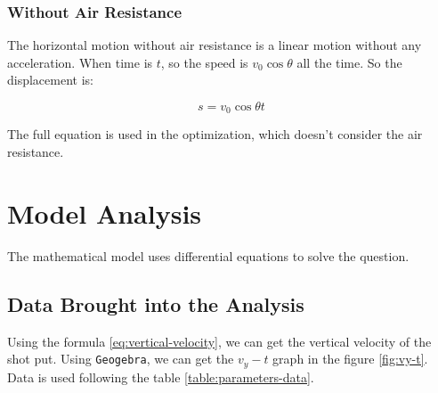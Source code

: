 \documentclass{article}
\begin{document}
\subsubsection{Without Air Resistance}

The horizontal motion without air resistance is a linear motion without any acceleration. When time is $t$, so the speed is $v_0\cos\theta$ all the time. So the displacement is:

\begin{equation}
    s=v_0\cos\theta t
\end{equation}

The full equation is used in the optimization, which doesn't consider the air resistance.

\section{Model Analysis}

\label{section:model-analysis}

The mathematical model uses differential equations to solve the question.

\subsection{Data Brought into the Analysis}

Using the formula \ref{eq:vertical-velocity}, we can get the vertical velocity of the shot put. Using \texttt{Geogebra}, we can get the $v_y-t$ graph in the figure \ref{fig:vy-t}. Data is used following the table \ref{table:parameters-data}.
\end{document}
